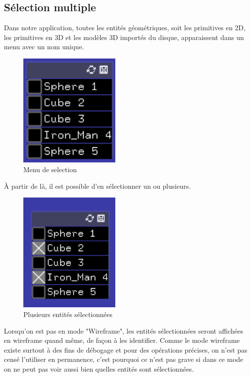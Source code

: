 \newpage

\subsection{Sélection multiple}

Dans notre application, toutes les entités géométriques, soit les primitives en 2D, les primitives en 3D et les modèles 3D importés du disque, apparaissent dans un menu avec un nom unique.

\begin{figure}[h]
	\centering
	\includegraphics[width=5cm]{fig/menuSelection.png}
	\caption{Menu de selection}
	\label{fig:test}
\end{figure}

À partir de là, il est possible d'en sélectionner un ou plusieurs.

\begin{figure}[h]
	\centering
	\includegraphics[width=5cm]{fig/menuSelectionPlusieurs.png}
	\caption{Plusieurs entités sélectionnées}
	\label{fig:test}
\end{figure}

\newpage

Lorsqu'on est pas en mode "Wireframe", les entités sélectionnées seront affichées en wireframe quand même, de façon à les identifier. Comme le mode wireframe existe surtout à des fins de débogage et pour des opérations précises, on n'est pas censé l'utiliser en permanence, c'est pourquoi ce n'est pas grave si dans ce mode on ne peut pas voir aussi bien quelles entités sont sélectionnées.

